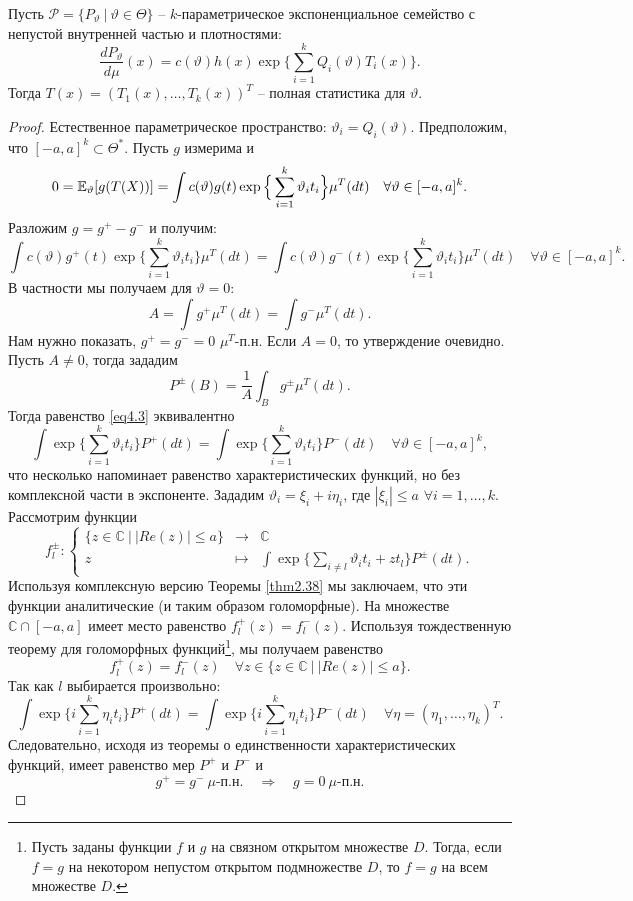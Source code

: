 \begin{thm} \label{thm4.25}
	Пусть $\mathcal{P} = \{ P_\vartheta\ |\ \vartheta \in \Theta \}$ -- $k$-параметрическое экспоненциальное семейство с непустой внутренней частью и плотностями:
	\[ \frac{dP_\vartheta}{d\mu}(x) = c(\vartheta) h(x) \exp\Big \{ \sum_{i=1}^{k}Q_i(\vartheta)T_i(x)  \Big\}. \]
	Тогда $T(x) = (T_1(x), \dots, T_k(x))^T$ -- полная статистика для $\vartheta$.
\end{thm}
\begin{proof}
	Естественное параметрическое пространство: $\vartheta_i = Q_i(\vartheta)$. Предположим, что $[-a, a]^k \subset \Theta^*$. Пусть $g$ измерима и
	\[ 0 = \mathbb{E}_\vartheta[g(T(X))] = \int c(\vartheta) g(t) \exp \Big\{ \sum_{i=1}^{k} \vartheta_i t_i  \Big \} \mu^T(dt) \quad \forall \vartheta \in [-a, a]^k. \]
	Разложим $g = g^+ - g^-$ и получим:
	\begin{equation} \label{eq4.3}
		\int c(\vartheta) g^+(t) \exp \Big\{ \sum_{i=1}^{k} \vartheta_i t_i  \Big \} \mu^T(dt)  = \int c(\vartheta) g^-(t) \exp \Big\{ \sum_{i=1}^{k} \vartheta_i t_i  \Big \} \mu^T(dt) \quad \forall \vartheta \in [-a, a]^k.
	\end{equation}
	В частности мы получаем для $\vartheta = 0$:
	\[ A = \int g^+ \mu^T(dt) = \int g^- \mu^T(dt). \]
	Нам нужно показать, $g^+ = g^- = 0$ $\mu^T$-п.н. Если $A = 0$, то утверждение очевидно. Пусть $ A \neq 0$, тогда зададим
	\[ P^\pm(B) = \frac{1}{A} \int_B g^\pm \mu^T(dt). \]
	Тогда равенство \eqref{eq4.3} эквивалентно
	\[ \int \exp \Big\{ \sum_{i=1}^{k} \vartheta_i t_i  \Big \} P^+(dt) = \int \exp \Big\{ \sum_{i=1}^{k} \vartheta_i t_i  \Big \} P^-(dt) \quad \forall \vartheta \in [-a, a]^k, \]
	что несколько напоминает равенство характеристических функций, но без комплексной части в экспоненте. Зададим $\vartheta_i = \xi_i + i \eta_i$, где $|\xi_i| \leq a$ $\forall i = 1, \dots, k $. Рассмотрим функции
	\[f_l^\pm:
	\left \{
	\begin{array}{ccl}
	\{ z \in \mathbb{C}\ |\ |Re(z)| \leq a \} & \rightarrow & \mathbb{C} \\
	z & \mapsto & \int \exp \Big\{ \sum\limits_{i \neq l} \vartheta_i t_i + z t_l \Big\} P^\pm(dt).
	\end{array}
	\right.
	\]
	Используя комплексную версию Теоремы \ref{thm2.38} мы заключаем, что эти функции аналитические (и таким образом голоморфные). На множестве $\mathbb{C} \cap [-a, a]$ имеет место равенство $f_l^+(z) = f_l^-(z)$. Используя тождественную теорему для голоморфных функций\footnote{
		Пусть заданы функции $f$ и $g$ на связном открытом множестве $D$. Тогда, если $f = g$ на некотором непустом открытом подмножестве $D$, то $f = g$ на всем множестве $D$.},
	мы получаем равенство
	\[ f_l^+(z) = f_l^-(z) \quad \forall z \in \{z \in \mathbb{C}\ |\ |Re(z)| \leq a  \}. \]
	Так как $l$ выбирается произвольно:
	\[ \int \exp \Big\{ i \sum_{i=1}^{k} \eta_i t_i \Big \} P^+(dt) = \int \exp \Big\{ i \sum_{i=1}^{k} \eta_i t_i \Big \} P^-(dt) \quad \forall \eta = (\eta_1, \dots, \eta_k)^T.  \]
	Следовательно, исходя из теоремы о единственности характеристических функций, имеет равенство мер $P^+$ и $P^-$ и
	\[ g^+ = g^- \ \mu\text{-п.н.} \quad \Longrightarrow \quad g = 0 \ \mu\text{-п.н.} \]
\end{proof}

